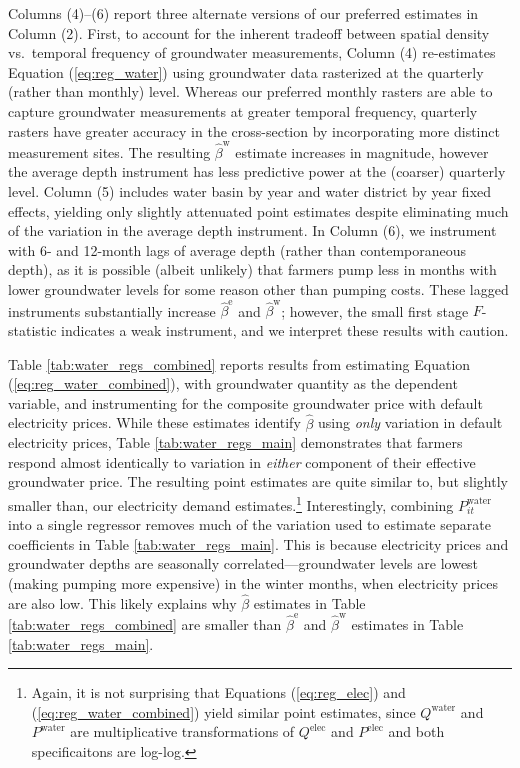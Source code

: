 Columns (4)--(6) report three alternate versions of our preferred estimates in Column (2). First, to account for the inherent tradeoff between spatial density vs.\ temporal frequency of groundwater measurements, Column (4)  re-estimates  Equation (\ref{eq:reg_water}) using groundwater data rasterized at the quarterly (rather than monthly) level. Whereas our preferred monthly rasters are able to capture groundwater measurements at greater temporal frequency, quarterly rasters have greater accuracy in the cross-section by incorporating more distinct measurement sites. The resulting $\hat\beta^{\text{w}}$ estimate increases in magnitude, however the average depth instrument has less predictive power at the (coarser) quarterly level.
Column (5) includes water basin by year and water district by year fixed effects, yielding only slightly attenuated point estimates despite eliminating much of the variation in the average depth instrument.
In Column (6), we instrument with 6- and 12-month lags of average depth (rather than contemporaneous depth), as it is possible (albeit unlikely) that farmers pump less in months with lower groundwater levels for some reason other than pumping costs. These lagged instruments substantially increase $\hat\beta^{\text{e}}$ and $\hat\beta^{\text{w}}$; however, the small first stage $F$-statistic indicates a weak instrument, and we interpret these results with caution.

Table \ref{tab:water_regs_combined} reports results from estimating Equation (\ref{eq:reg_water_combined}), with groundwater quantity as the dependent variable, and instrumenting for the composite groundwater price with default electricity prices. While these estimates identify $\hat\beta$ using \emph{only} variation in default electricity prices, Table \ref{tab:water_regs_main} demonstrates that farmers respond almost identically to variation in \emph{either} component of their effective groundwater price.  The resulting point estimates are quite similar to, but slightly smaller than, our electricity demand estimates.\footnote{
Again, it is not surprising that Equations (\ref{eq:reg_elec}) and (\ref{eq:reg_water_combined}) yield similar point estimates, since $Q^{\text{water}}$ and $P^{\text{water}}$ are multiplicative transformations of $Q^{\text{elec}}$ and $P^{\text{elec}}$ and both specificaitons are log-log.
} 
Interestingly, combining $P^{\text{water}}_{it}$ into a single regressor removes much of the variation used to estimate separate coefficients in Table \ref{tab:water_regs_main}. This is because electricity prices and groundwater depths are seasonally correlated---groundwater levels are lowest (making pumping more expensive) in the winter months, when electricity prices are also low. This likely explains why $\hat\beta$ estimates in Table \ref{tab:water_regs_combined} are smaller than $\hat\beta^{\text{e}}$ and $\hat\beta^{\text{w}}$ estimates in Table \ref{tab:water_regs_main}. 



